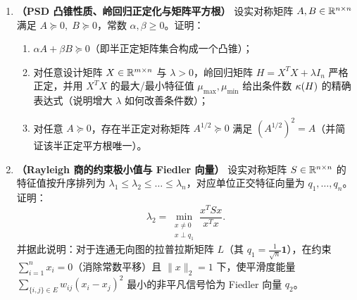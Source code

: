 
\begin{enumerate}[label=\textbf{3.\arabic*}, leftmargin=2.4em, resume]
  \item \textbf{（PSD 凸锥性质、岭回归正定化与矩阵平方根）} 设实对称矩阵 $A, B \in \mathbb{R}^{n\times n}$ 满足 $A \succeq 0,\; B \succeq 0$，常数 $\alpha, \beta \ge 0$。证明：
  \begin{enumerate}[label=(\arabic*), leftmargin=1.8em]
    \item $\alpha A + \beta B \succeq 0$（即半正定矩阵集合构成一个凸锥）；
    \item 对任意设计矩阵 $X \in \mathbb{R}^{m\times n}$ 与 $\lambda > 0$，岭回归矩阵 $H = X^T X + \lambda I_n$ 严格正定，并用 $X^T X$ 的最大/最小特征值 $\mu_{\max}, \mu_{\min}$ 给出条件数 $\kappa(H)$ 的精确表达式（说明增大 $\lambda$ 如何改善条件数）；
    \item 对任意 $A \succeq 0$，存在半正定对称矩阵 $A^{1/2} \succeq 0$ 满足 $(A^{1/2})^2 = A$（并简证该半正定平方根唯一）。
  \end{enumerate}

  \item \textbf{（Rayleigh 商的约束极小值与 Fiedler 向量）} 设实对称矩阵 $S \in \mathbb{R}^{n\times n}$ 的特征值按升序排列为 $\lambda_1 \le \lambda_2 \le \dots \le \lambda_n$，对应单位正交特征向量为 $q_1, \dots, q_n$。证明：
  \[
    \lambda_2 = \min_{\substack{x \neq 0 \\ x \perp q_1}} \frac{x^T S x}{x^T x}.
  \]
  并据此说明：对于连通无向图的拉普拉斯矩阵 $L$（其 $q_1 = \frac{1}{\sqrt{n}}\mathbf{1}$），在约束 $\sum_{i=1}^n x_i = 0$（消除常数平移）且 $\|x\|_2 = 1$ 下，使平滑度能量 $\sum_{\{i,j\}\in E} w_{ij}(x_i - x_j)^2$ 最小的非平凡信号恰为 Fiedler 向量 $q_2$。
\end{enumerate}


